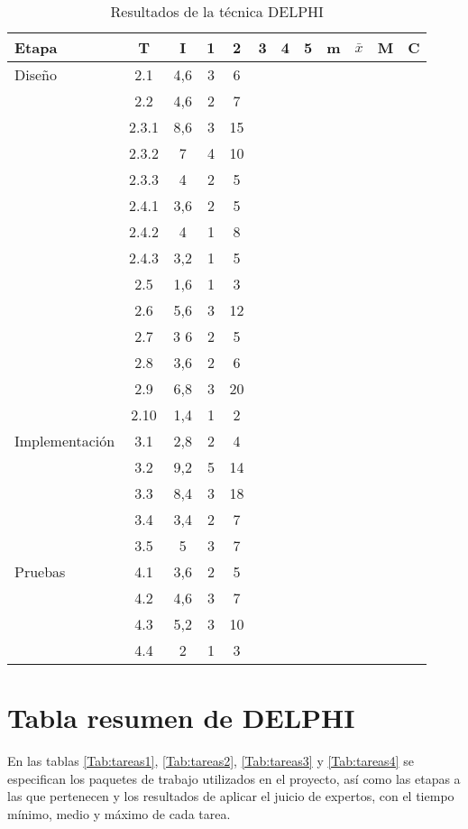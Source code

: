\documentclass[11pt,a4paper,spanish,twoside]{report}
\begin{document}
\begin{table}[!h]
\centering
  \begin{tabular}{|p{2.7cm}||c|c||c|c|c|c|c||c|c|c||c|}
    \hline
    \textbf{Etapa} & \textbf{T} & \textbf{I} & \textbf{1} &
    \textbf{2} & \textbf{3} & \textbf{4} & \textbf{5} & \textbf{m}
    &\textbf{$\bar{x}$} &\textbf{M} & \textbf{C}\\
    \hline \hline
    \hline
    Diseño & 2.1 & 4,6 & 3 & 6\\
    \cline{2-5}
    & 2.2 & 4,6 & 2 & 7\\
    \cline{2-5}
    & 2.3.1 & 8,6 & 3 & 15\\
    \cline{2-5}
    & 2.3.2 & 7 & 4 & 10\\
    \cline{2-5}
    & 2.3.3 & 4 & 2 & 5\\
    \cline{2-5}
    & 2.4.1 & 3,6 & 2 & 5\\
    \cline{2-5}
    & 2.4.2 & 4 & 1 & 8\\
    \cline{2-5}
    & 2.4.3 & 3,2 & 1 & 5\\
    \cline{2-5}
    & 2.5 & 1,6 & 1 & 3\\
    \cline{2-5}
    & 2.6 & 5,6 & 3 & 12\\
    \cline{2-5}
    & 2.7 & 3 6 & 2 & 5\\
    \cline{2-5}
    & 2.8 & 3,6 & 2 & 6\\
    \cline{2-5}
    & 2.9 & 6,8 & 3 & 20\\
    \cline{2-5}
    & 2.10 & 1,4 & 1 & 2\\
    \hline
    Implementación & 3.1 & 2,8 & 2 & 4\\
    \cline{2-5}
    & 3.2 & 9,2 & 5 & 14\\
    \cline{2-5}
    & 3.3 & 8,4 & 3 & 18\\
    \cline{2-5}
    & 3.4 & 3,4 & 2 & 7\\
    \cline{2-5}
    & 3.5 & 5 & 3 & 7\\
    \hline
    Pruebas & 4.1 & 3,6 & 2 & 5\\
    \cline{2-5}
    & 4.2 & 4,6 & 3 & 7\\
    \cline{2-5}
    & 4.3 & 5,2 & 3 & 10\\
    \cline{2-5}
    & 4.4 & 2 & 1 & 3\\
    \hline
  \end{tabular}
  \caption{Resultados de la técnica DELPHI} \label{Tab:val}
\end{table}
\section{Tabla resumen de DELPHI}
En las tablas \ref{Tab:tareas1}, \ref{Tab:tareas2}, \ref{Tab:tareas3} y \ref{Tab:tareas4} se especifican los paquetes de trabajo
utilizados en el proyecto, así como las etapas a las que pertenecen y los
resultados de aplicar el juicio de expertos, con el tiempo mínimo, medio y
máximo de cada tarea.
\end{document}
